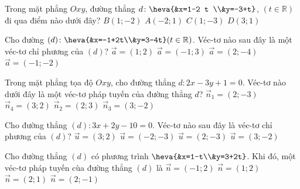 \begin{ex}%
	Trong mặt phẳng $O x y$, đường  thẳng $d\colon\heva{&x=1-2 t \\&y=-3+t}$, $(t \in \mathbb{R})$ đi qua điểm nào dưới đây?
	\choice 
		 {$B(1;-2)$}
		{$A(-2;  1)$}
		{\True $C(1;-3)$} 
		{$D(3;  1)$}
\end{ex}

\begin{ex}%
	Cho đường $(d)\colon \heva{&x=-1+2t\\&y=3-4t}  (t\in\mathbb{R})$. Véc-tơ nào sau đây là một véc-tơ chỉ phương của $(d)$?
	\choice 
		 {$\overrightarrow{a}=(1;2)$}
		{$\overrightarrow{a}=(-1;3)$} 
		{\True  $\overrightarrow{a}=(2;-4)$}
		 {$\overrightarrow{a}=(-1;-2)$}
\end{ex}

\begin{ex}%
	Trong mặt phẳng tọa độ  $Oxy$, cho đường thẳng $d\colon 2x-3y+1=0$. Véc-tơ nào dưới đây là một véc-tơ pháp tuyến của đường thẳng $d$?
	 \choice
		{\True  $\overrightarrow{n}_1=(2;-3)$}
		{$\overrightarrow{n}_4=(3;2)$} 
		{$\overrightarrow{n}_2=(2;3)$} 
		 {$\overrightarrow{n}_3=(3;-2)$}
\end{ex}

\begin{ex}%
	Cho đường thẳng $(d)\colon 3x+2y-10=0$. Véc-tơ nào sau đây  là véc-tơ chỉ phương của $(d)$?
	 \choice
		 {$\overrightarrow{u}=(3;2)$}
		 {$\overrightarrow{u}=(-2;-3)$}
		{\True $\overrightarrow{u}=(2;-3)$} 
		{$\overrightarrow{u}=(3;-2)$} 
\end{ex}

\begin{ex}%
	Cho đường thẳng $(d)$ có phương  trình $\heva{&x=1-t\\&y=3+2t}$. Khi đó, một véc-tơ pháp tuyến cùa đường thẳng $(d)$ là
	\choice 
		 {$\overrightarrow{n}=(-1;2)$}
		{$\overrightarrow{n}=(1;2)$} 
		{\True  $\overrightarrow{n}=(2;1)$}
		{$\overrightarrow{n}=(2;-1)$} 
\end{ex}

